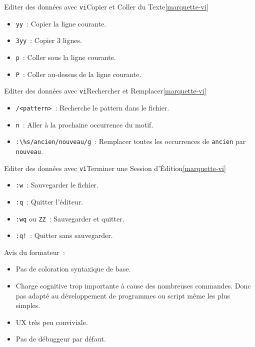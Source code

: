 \documentclass{beamer}
\begin{document}
    \begin{frame}{Editer des données avec \lstinline{vi}}{Copier et Coller du Texte\cref{marquette-vi}}
        \begin{itemize}
            \item \lstinline{yy}~: Copier la ligne courante.
            \item \lstinline{3yy}~: Copier 3 lignes.
            \item \lstinline{p}~: Coller sous la ligne courante.
            \item \lstinline{P}~: Coller au-dessus de la ligne courante.
        \end{itemize}
    \end{frame}

    \begin{frame}{Editer des données avec \lstinline{vi}}{Rechercher et Remplacer\cref{marquette-vi}}
        \begin{itemize}
            \item \lstinline{/<pattern>}~: Recherche le pattern dans le fichier.
            \item \lstinline{n}~: Aller à la prochaine occurrence du motif.
            \item \lstinline{:\%s/ancien/nouveau/g}~: Remplacer toutes les occurrences de \lstinline{ancien} par \lstinline{nouveau}.
        \end{itemize}
    \end{frame}


    \begin{frame}{Editer des données avec \lstinline{vi}}{Terminer une Session d'Édition\cref{marquette-vi}}
        \begin{itemize}
            \item \lstinline{:w}~: Sauvegarder le fichier.
            \item \lstinline{:q}~: Quitter l'éditeur.
            \item \lstinline{:wq} ou \lstinline{ZZ}~: Sauvegarder et quitter.
            \item \lstinline{:q!}~: Quitter sans sauvegarder.
        \end{itemize}

        \begin{dangercolorbox}
            Avis du formateur~:
            \begin{itemize}
                \item Pas de coloration syntaxique de base.
                \item Charge cognitive trop importante à cause des nombreuses commandes.
                Donc pas adapté au développement de programmes ou script même les plus simples.
                \item UX très peu conviviale.
                \item Pas de débuggeur par défaut.
            \end{itemize}
        \end{dangercolorbox}
    \end{frame}
\end{document}
